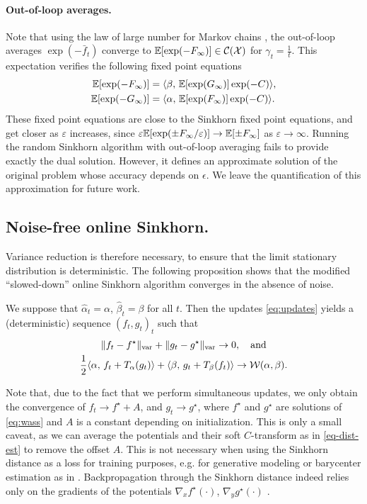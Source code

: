 \paragraph{Out-of-loop averages.} Note that using the law of large number for Markov chains
\citep{breiman_strong_1960}, the out-of-loop averages $\exp(-\bar f_t)$
converge to $\mathbb{E}[\exp(-F_\infty)] \in \mathcal{C}(\mathcal{X})$ for $\gamma_t = \frac{1}{t}$. This expectation verifies the following fixed point equations
\begin{align}
    \mathbb{E}[\exp(-F_\infty)] &=
     \langle \beta,\,\mathbb{E}[\exp(G_\infty)] \exp(-C)\rangle, \\
    \mathbb{E}[\exp(-G_\infty)] &=
     \langle \alpha,\,\mathbb{E}[\exp(F_\infty)] \exp(-C)\rangle.
\end{align}
These fixed point equations are close to the Sinkhorn fixed point equations, and
get closer as $\varepsilon$ increases, since $\varepsilon \mathbb{E}[\exp(\pm F_\infty /
\varepsilon)] \to \mathbb{E}[\pm F_\infty]$ as $\varepsilon \to \infty$. Running the random
Sinkhorn algorithm with out-of-loop averaging fails to provide exactly the dual solution.
However, it defines an approximate solution of the original problem whose accuracy depends on $\epsilon$. 
%
We leave the quantification of this approximation for future work.

\subsection{Noise-free online Sinkhorn.}

Variance reduction is therefore necessary, to ensure that the limit stationary
distribution is deterministic. The following proposition shows that the modified ``slowed-down'' online Sinkhorn algorithm converges in the absence of noise.

\begin{proposition}\label{eq:deterministic}
    We suppose that $\hat \alpha_t = \alpha$, $\hat \beta_t = \beta$ for all
    $t$. Then the updates \eqref{eq:updates} yields a (deterministic) sequence $(f_t, g_t)_t$ such
    that 
    \begin{gather}
        \Vert f_t - f^\star \Vert_{\text{var}} 
        + \Vert g_t - g^\star \Vert_{\text{var}} \to 0,\quad\text{and} \\
        \frac{1}{2} \langle \alpha,\,f_t + T_{\alpha}(g_t)\rangle + \langle \beta,\,g_t + T_{\beta}(f_t)\rangle 
         \to \mathcal{W}(\alpha, \beta).
    \end{gather}
\end{proposition}
Note that, due to the fact that we perform simultaneous updates, we only obtain
the convergence of $f_t \to f^\star + A$, and $g_t \to g^\star$, where $f^\star$
and $g^\star$ are solutions of \eqref{eq:wass} and $A$ is a constant depending
on initialization. This is only a small caveat, as we can average the potentials
and their soft $C$-transform as in \eqref{eq-dist-est} to remove the offset $A$.
This is not necessary when using the Sinkhorn distance as a loss for training
purposes, e.g. for generative modeling or barycenter estimation as in
\citet{staib2017parallel}. Backpropagation through the Sinkhorn distance indeed
relies only on the gradients of the potentials $\nabla_x f^\star(\cdot)$,
$\nabla_y g^\star(\cdot)$ \citep[e.g.][]{cuturi2018semidual}.
